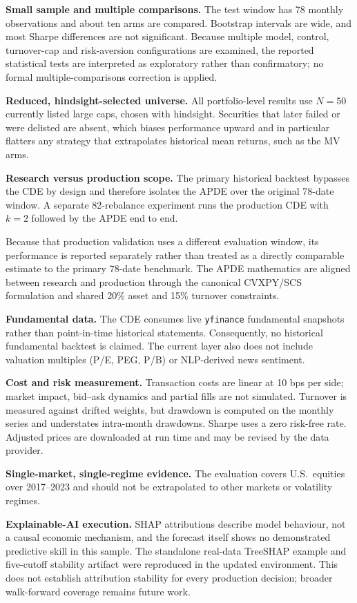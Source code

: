 \documentclass[conference]{IEEEtran}
\begin{document}
\textbf{Small sample and multiple comparisons.} The test window has 78
monthly observations and about ten arms are compared. Bootstrap
intervals are wide, and most Sharpe differences are not significant.
Because multiple model, control, turnover-cap and risk-aversion
configurations are examined, the reported statistical tests are
interpreted as exploratory rather than confirmatory; no formal
multiple-comparisons correction is applied.

\textbf{Reduced, hindsight-selected universe.} All portfolio-level
results use $N=50$ currently listed large caps, chosen with hindsight.
Securities that later failed or were delisted are absent, which biases
performance upward and in particular flatters any strategy that
extrapolates historical mean returns, such as the MV arms.

\textbf{Research versus production scope.} The primary historical
backtest bypasses the CDE by design and therefore isolates the APDE over
the original 78-date window. A separate 82-rebalance experiment runs
the production CDE with $k=2$ followed by the APDE end to end.

Because that production validation uses a different evaluation window,
its performance is reported separately rather than treated as a directly
comparable estimate to the primary 78-date benchmark. The APDE
mathematics are aligned between research and production through the
canonical CVXPY/SCS formulation and shared 20\% asset and 15\%
turnover constraints.

\textbf{Fundamental data.} The CDE consumes live \texttt{yfinance}
fundamental snapshots rather than point-in-time historical statements.
Consequently, no historical fundamental backtest is claimed. The
current layer also does not include valuation multiples (P/E, PEG,
P/B) or NLP-derived news sentiment.

\textbf{Cost and risk measurement.} Transaction costs are linear at
10 bps per side; market impact, bid--ask dynamics and partial fills are
not simulated. Turnover is measured against drifted weights, but
drawdown is computed on the monthly series and understates intra-month
drawdowns. Sharpe uses a zero risk-free rate. Adjusted prices are
downloaded at run time and may be revised by the data provider.

\textbf{Single-market, single-regime evidence.} The evaluation covers
U.S.\ equities over 2017--2023 and should not be extrapolated to other
markets or volatility regimes.

\textbf{Explainable-AI execution.} SHAP attributions describe model
behaviour, not a causal economic mechanism, and the forecast itself
shows no demonstrated predictive skill in this sample. The standalone
real-data TreeSHAP example and five-cutoff stability artifact were
reproduced in the updated environment. This does not establish attribution
stability for every production decision; broader walk-forward coverage
remains future work.
\end{document}
